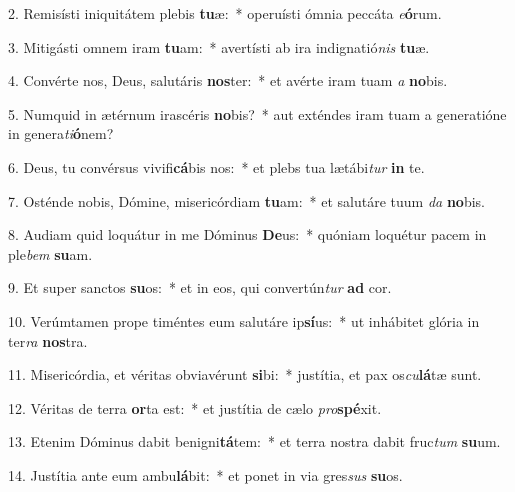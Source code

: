 2. Remisísti iniquitátem plebis \textbf{tu}æ:~*  operuísti ómnia peccáta \textit{e}\textbf{ó}rum.\

3. Mitigásti omnem iram \textbf{tu}am:~*  avertísti ab ira indignatió\textit{nis} \textbf{tu}æ.\

4. Convérte nos, Deus, salutáris \textbf{nos}ter:~*  et avérte iram tuam \textit{a} \textbf{no}bis.\

5. Numquid in ætérnum irascéris \textbf{no}bis?~*  aut exténdes iram tuam a generatióne in genera\textit{ti}\textbf{ó}nem?\

6. Deus, tu convérsus vivifi\textbf{cá}bis nos:~*  et plebs tua lætábi\textit{tur} \textbf{in} te.\

7. Osténde nobis, Dómine, misericórdiam \textbf{tu}am:~*  et salutáre tuum \textit{da} \textbf{no}bis.\

8. Audiam quid loquátur in me Dóminus \textbf{De}us:~*  quóniam loquétur pacem in ple\textit{bem} \textbf{su}am.\

9. Et super sanctos \textbf{su}os:~*  et in eos, qui convertún\textit{tur} \textbf{ad} cor.\

10. Verúmtamen prope timéntes eum salutáre ip\textbf{sí}us:~*  ut inhábitet glória in ter\textit{ra} \textbf{nos}tra.\

11. Misericórdia, et véritas obviavérunt \textbf{si}bi:~*  justítia, et pax os\textit{cu}\textbf{lá}tæ sunt.\

12. Véritas de terra \textbf{or}ta est:~*  et justítia de cælo \textit{pro}\textbf{spé}xit.\

13. Etenim Dóminus dabit benigni\textbf{tá}tem:~*  et terra nostra dabit fruc\textit{tum} \textbf{su}um.\

14. Justítia ante eum ambu\textbf{lá}bit:~*  et ponet in via gres\textit{sus} \textbf{su}os.\

